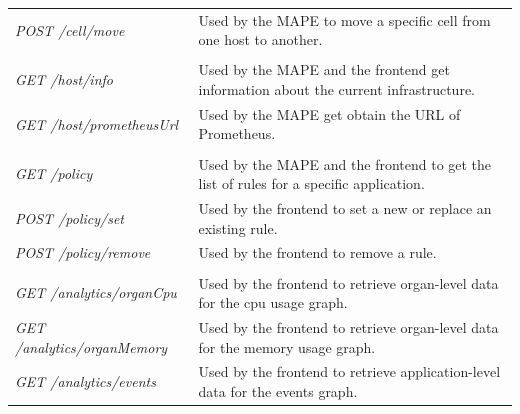 \documentclass{seal_thesis}
\begin{document}
\begin{table}
\begin{tabularx}{\textwidth}{|l|X|}
		\rowcolor[gray]{0.9}
		\multicolumn{2}{|c|}{Cell} 
			\\ \hline
		\textit{POST /cell/move}
			& Used by the MAPE to move a specific cell from one host to another.
			\\ \hline

		\rowcolor[gray]{0.9}
		\multicolumn{2}{|c|}{Host} 
			\\ \hline
		\textit{GET /host/info}
			& Used by the MAPE and the frontend get information about the current infrastructure.
			\\ \hline
		\textit{GET /host/prometheusUrl}
			& Used by the MAPE get obtain the URL of Prometheus.
			\\ \hline
			
		\rowcolor[gray]{0.9}
		\multicolumn{2}{|c|}{Rule} 
			\\ \hline
		\textit{GET /policy}
			& Used by the MAPE and the frontend to get the list of rules for a specific application.
			\\ \hline
		\textit{POST /policy/set}
			& Used by the frontend to set a new or replace an existing rule.
			\\ \hline
		\textit{POST /policy/remove}
			& Used by the frontend to remove a rule.
			\\ \hline
		
		\rowcolor[gray]{0.9}
		\multicolumn{2}{|c|}{Analytics}
			\\ \hline
		\textit{GET /analytics/organCpu}
			& Used by the frontend to retrieve organ-level data for the cpu usage graph.
			\\ \hline
		\textit{GET /analytics/organMemory}
			& Used by the frontend to retrieve organ-level data for the memory usage graph.
			\\ \hline
		\textit{GET /analytics/events}
			& Used by the frontend to retrieve application-level data for the events graph.
			\\ \hline
	\end{tabularx}
\end{table}
\end{document}
